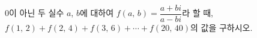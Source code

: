 $0$이 아닌 두 실수 $a$, $b$에 대하여 $f(a,\,b)=\dfrac{a+bi}{a-bi}$라 할 때, $f(1,\,2)+f(2,\,4)+f(3,\,6)+\cdots+f(20,\,40)$의 값을 구하시오.
